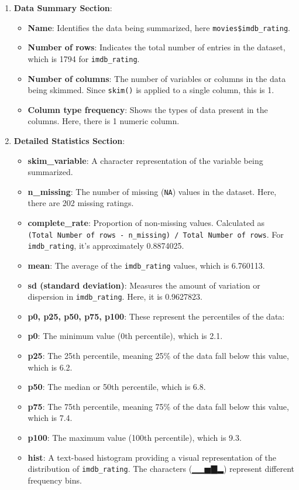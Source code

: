 \documentclass[
]{book}
\providecommand{\tightlist}{%
  \setlength{\itemsep}{0pt}\setlength{\parskip}{0pt}}
\begin{document}
\begin{enumerate}
\def\labelenumi{\arabic{enumi}.}
\tightlist
\item
  \textbf{Data Summary Section}:

  \begin{itemize}
  \tightlist
  \item
    \textbf{Name}: Identifies the data being summarized, here \texttt{movies\$imdb\_rating}.
  \item
    \textbf{Number of rows}: Indicates the total number of entries in the dataset, which is 1794 for \texttt{imdb\_rating}.
  \item
    \textbf{Number of columns}: The number of variables or columns in the data being skimmed. Since \texttt{skim()} is applied to a single column, this is 1.
  \item
    \textbf{Column type frequency}: Shows the types of data present in the columns. Here, there is 1 numeric column.
  \end{itemize}
\item
  \textbf{Detailed Statistics Section}:

  \begin{itemize}
  \tightlist
  \item
    \textbf{skim\_variable}: A character representation of the variable being summarized.
  \item
    \textbf{n\_missing}: The number of missing (\texttt{NA}) values in the dataset. Here, there are 202 missing ratings.
  \item
    \textbf{complete\_rate}: Proportion of non-missing values. Calculated as \texttt{(Total\ Number\ of\ rows\ -\ n\_missing)\ /\ Total\ Number\ of\ rows}. For \texttt{imdb\_rating}, it's approximately 0.8874025.
  \item
    \textbf{mean}: The average of the \texttt{imdb\_rating} values, which is 6.760113.
  \item
    \textbf{sd (standard deviation)}: Measures the amount of variation or dispersion in \texttt{imdb\_rating}. Here, it is 0.9627823.
  \item
    \textbf{p0, p25, p50, p75, p100}: These represent the percentiles of the data:
  \item
    \textbf{p0}: The minimum value (0th percentile), which is 2.1.
  \item
    \textbf{p25}: The 25th percentile, meaning 25\% of the data fall below this value, which is 6.2.
  \item
    \textbf{p50}: The median or 50th percentile, which is 6.8.
  \item
    \textbf{p75}: The 75th percentile, meaning 75\% of the data fall below this value, which is 7.4.
  \item
    \textbf{p100}: The maximum value (100th percentile), which is 9.3.
  \item
    \textbf{hist}: A text-based histogram providing a visual representation of the distribution of \texttt{imdb\_rating}. The characters (▁▁▅▇▂) represent different frequency bins.
  \end{itemize}
\end{enumerate}
\end{document}
